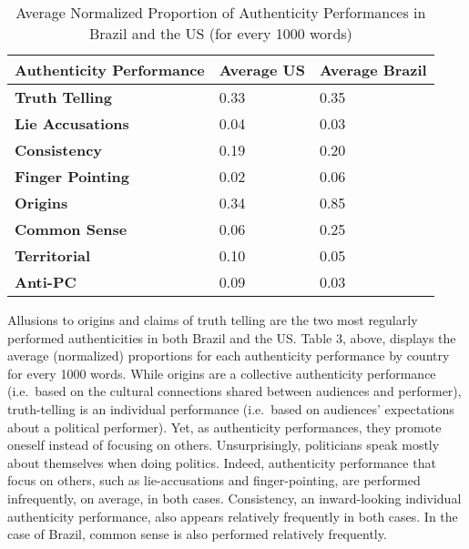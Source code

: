 \documentclass[
  12pt,
]{article}
\begin{document}
\begin{table}[H]

\caption{\label{tab:table 3}Average Normalized Proportion of Authenticity Performances in Brazil and the US (for every 1000 words)}
\centering
\begin{tabular}[t]{>{}lll}
\toprule
Authenticity Performance & Average US & Average Brazil\\
\midrule
\textbf{Truth Telling} & 0.33 & 0.35\\
\textbf{Lie Accusations} & 0.04 & 0.03\\
\textbf{Consistency} & 0.19 & 0.20\\
\textbf{Finger Pointing} & 0.02 & 0.06\\
\textbf{Origins} & 0.34 & 0.85\\
\addlinespace
\textbf{Common Sense} & 0.06 & 0.25\\
\textbf{Territorial} & 0.10 & 0.05\\
\textbf{Anti-PC} & 0.09 & 0.03\\
\bottomrule
\end{tabular}
\end{table}

Allusions to origins and claims of truth telling are the two most
regularly performed authenticities in both Brazil and the US. Table 3,
above, displays the average (normalized) proportions for each
authenticity performance by country for every 1000 words. While origins
are a collective authenticity performance (i.e.~based on the cultural
connections shared between audiences and performer), truth-telling is an
individual performance (i.e.~based on audiences' expectations about a
political performer). Yet, as authenticity performances, they promote
oneself instead of focusing on others. Unsurprisingly, politicians speak
mostly about themselves when doing politics. Indeed, authenticity
performance that focus on others, such as lie-accusations and
finger-pointing, are performed infrequently, on average, in both cases.
Consistency, an inward-looking individual authenticity performance, also
appears relatively frequently in both cases. In the case of Brazil,
common sense is also performed relatively frequently.
\end{document}
